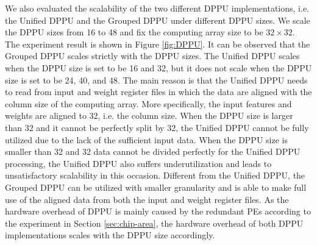 We also evaluated the scalability of the two different DPPU implementations, i.e. the Unified DPPU and the Grouped DPPU under different DPPU sizes. We scale the DPPU sizes from 16 to 48 and fix the computing array size to be $32 \times 32$. The experiment result is shown in Figure \ref{fig:DPPU}. It can be observed that the Grouped DPPU scales strictly with the DPPU sizes. The Unified DPPU scales when the DPPU size is set to be 16 and 32, but it does not scale when the DPPU size is set to be 24, 40, and 48. The main reason is that the Unified DPPU needs to read from input and weight register files in which the data are aligned with the column size of the computing array. More specifically, the input features and weights are aligned to 32, i.e. the column size. When the DPPU size is larger than 32 and it cannot be perfectly split by 32, the Unified DPPU cannot be fully utilized due to the lack of the sufficient input data. When the DPPU size is smaller than 32 and 32 data cannot be divided perfectly for the Unified DPPU processing, the Unified DPPU also suffers underutilization and leads to unsatisfactory scalability in this occasion. Different from the Unified DPPU, the Grouped DPPU can be utilized with smaller granularity and is able to make full use of the aligned data from both the input and weight register files. As the hardware overhead of DPPU is mainly caused by the redundant PEs according to the experiment in Section \ref{sec:chip-area}, the hardware overhead of both DPPU implementations scales with the DPPU size accordingly.

